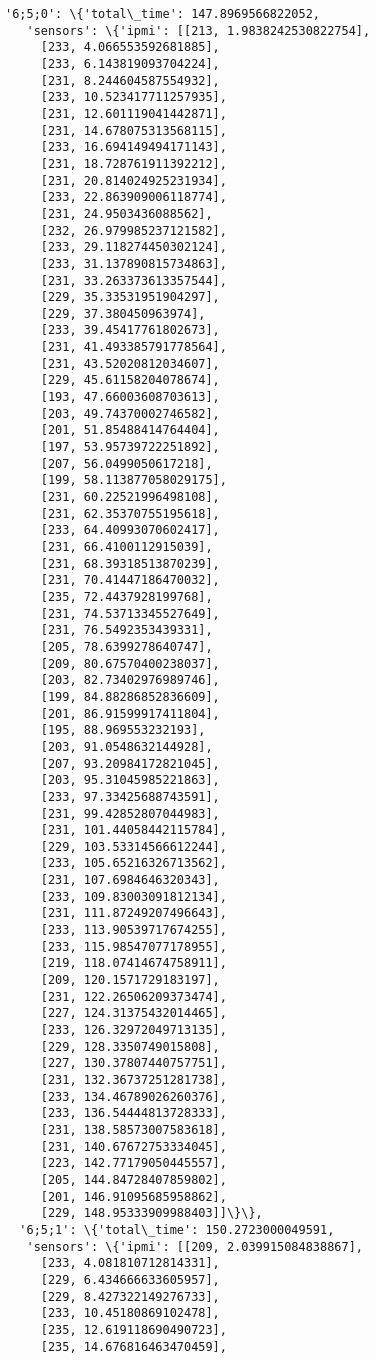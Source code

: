 \documentclass[11pt]{article}
\begin{document}
\begin{tcolorbox}[breakable, size=fbox, boxrule=.5pt, pad at break*=1mm, opacityfill=0]
\begin{Verbatim}[commandchars=\\\{\}]
  '6;5;0': \{'total\_time': 147.8969566822052,
   'sensors': \{'ipmi': [[213, 1.9838242530822754],
     [233, 4.066553592681885],
     [233, 6.143819093704224],
     [231, 8.244604587554932],
     [233, 10.523417711257935],
     [231, 12.601119041442871],
     [231, 14.678075313568115],
     [233, 16.694149494171143],
     [231, 18.728761911392212],
     [231, 20.814024925231934],
     [233, 22.863909006118774],
     [231, 24.9503436088562],
     [232, 26.979985237121582],
     [233, 29.118274450302124],
     [233, 31.137890815734863],
     [231, 33.263373613357544],
     [229, 35.33531951904297],
     [229, 37.380450963974],
     [233, 39.45417761802673],
     [231, 41.493385791778564],
     [231, 43.52020812034607],
     [229, 45.61158204078674],
     [193, 47.66003608703613],
     [203, 49.74370002746582],
     [201, 51.85488414764404],
     [197, 53.95739722251892],
     [207, 56.0499050617218],
     [199, 58.113877058029175],
     [231, 60.22521996498108],
     [231, 62.35370755195618],
     [233, 64.40993070602417],
     [231, 66.4100112915039],
     [231, 68.39318513870239],
     [231, 70.41447186470032],
     [235, 72.4437928199768],
     [231, 74.53713345527649],
     [231, 76.5492353439331],
     [205, 78.6399278640747],
     [209, 80.67570400238037],
     [203, 82.73402976989746],
     [199, 84.88286852836609],
     [201, 86.91599917411804],
     [195, 88.969553232193],
     [203, 91.0548632144928],
     [207, 93.20984172821045],
     [203, 95.31045985221863],
     [233, 97.33425688743591],
     [231, 99.42852807044983],
     [231, 101.44058442115784],
     [229, 103.53314566612244],
     [233, 105.65216326713562],
     [231, 107.6984646320343],
     [233, 109.83003091812134],
     [231, 111.87249207496643],
     [233, 113.90539717674255],
     [233, 115.98547077178955],
     [219, 118.07414674758911],
     [209, 120.1571729183197],
     [231, 122.26506209373474],
     [227, 124.31375432014465],
     [233, 126.32972049713135],
     [229, 128.3350749015808],
     [227, 130.37807440757751],
     [231, 132.36737251281738],
     [233, 134.46789026260376],
     [233, 136.54444813728333],
     [231, 138.58573007583618],
     [231, 140.67672753334045],
     [223, 142.77179050445557],
     [205, 144.84728407859802],
     [201, 146.91095685958862],
     [229, 148.95333909988403]]\}\},
  '6;5;1': \{'total\_time': 150.2723000049591,
   'sensors': \{'ipmi': [[209, 2.039915084838867],
     [233, 4.081810712814331],
     [229, 6.434666633605957],
     [229, 8.427322149276733],
     [233, 10.45180869102478],
     [235, 12.619118690490723],
     [235, 14.676816463470459],

\end{Verbatim}
\end{tcolorbox}
\end{document}
